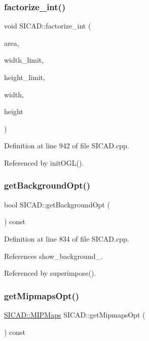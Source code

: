 \subsubsection{\texorpdfstring{factorize\+\_\+int()}{factorize\_int()}}
{\footnotesize\ttfamily void S\+I\+C\+A\+D\+::factorize\+\_\+int (\begin{DoxyParamCaption}\item[{const G\+Lsizei}]{area,  }\item[{const G\+Lsizei}]{width\+\_\+limit,  }\item[{const G\+Lsizei}]{height\+\_\+limit,  }\item[{G\+Lsizei \&}]{width,  }\item[{G\+Lsizei \&}]{height }\end{DoxyParamCaption})\hspace{0.3cm}{\ttfamily [private]}}



Definition at line 942 of file S\+I\+C\+A\+D.\+cpp.



Referenced by init\+O\+G\+L().

\mbox{\label{classSICAD_a170bd325654aed9eb81062ac610608fa}} 
\subsubsection{\texorpdfstring{get\+Background\+Opt()}{getBackgroundOpt()}}
{\footnotesize\ttfamily bool S\+I\+C\+A\+D\+::get\+Background\+Opt (\begin{DoxyParamCaption}{ }\end{DoxyParamCaption}) const}



Definition at line 834 of file S\+I\+C\+A\+D.\+cpp.



References show\+\_\+background\+\_\+.



Referenced by superimpose().

\mbox{\label{classSICAD_a8033a99745f595ea5205e3830cabc389}} 
\subsubsection{\texorpdfstring{get\+Mipmaps\+Opt()}{getMipmapsOpt()}}
{\footnotesize\ttfamily \mbox{\hyperlink{classSICAD_a7e092dede6f660355462d6d548214198}{S\+I\+C\+A\+D\+::\+M\+I\+P\+Maps}} S\+I\+C\+A\+D\+::get\+Mipmaps\+Opt (\begin{DoxyParamCaption}{ }\end{DoxyParamCaption}) const}



